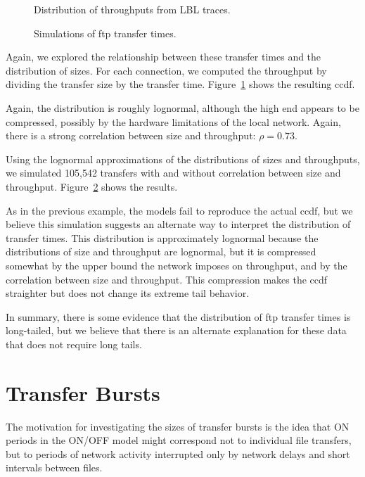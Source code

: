 \documentclass[twocolumn,11pt]{infocom}
\begin{document}
\begin{figure}[tb]
\centerline{}
\caption{Distribution of throughputs from LBL traces.}
\label{fig.lbl.bw}
\end{figure}

\begin{figure}[tb]
\centerline{}
\caption{Simulations of ftp transfer times.}
\label{fig.sim2}
\end{figure}

Again, we explored the relationship between these transfer times
and the distribution of sizes.
For each connection, we computed the throughput
by dividing the transfer size by the transfer time.
Figure~\ref{fig.lbl.bw} shows the resulting ccdf.


Again, the distribution is roughly lognormal, although the
high end appears to be compressed, possibly
by the hardware limitations of
the local network.  Again, there is a strong correlation
between size and throughput: $\rho = 0.73$.

Using the lognormal approximations of the distributions of
sizes and throughputs, we simulated 105,542 transfers with
and without correlation between size and throughput.
Figure~\ref{fig.sim2} shows the results.

As in the previous example, the models fail to reproduce the
actual ccdf, but we believe this simulation suggests an alternate
way to interpret the distribution of transfer times.  This
distribution is approximately lognormal because the distributions
of size and throughput are lognormal, but it is compressed somewhat
by the upper bound the network imposes on throughput, and by
the correlation between size and throughput.  This compression
makes the ccdf straighter but does not change its extreme
tail behavior.

In summary, there is some evidence that the distribution of
ftp transfer times is long-tailed, but we believe that there
is an alternate explanation for these data that does not
require long tails.


\section {Transfer Bursts}
\label{burst}

The motivation for investigating the sizes of transfer bursts
is the idea that ON periods in the ON/OFF model might
correspond not to individual file transfers, but to periods
of network activity interrupted only by network delays and
short intervals between files.
\end{document}
